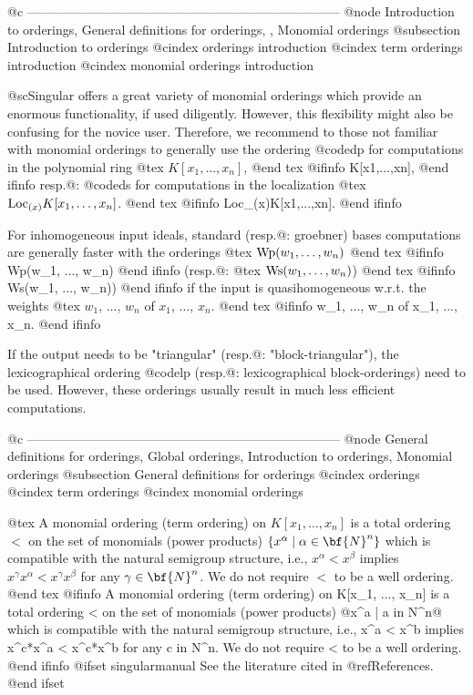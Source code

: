 @c --------------------------------------------------------------------------
@node Introduction to orderings, General definitions for orderings, , Monomial orderings
@subsection Introduction to orderings
@cindex orderings introduction
@cindex term orderings introduction
@cindex monomial orderings introduction

@sc{Singular} offers a great variety of monomial orderings which provide
an enormous functionality, if used diligently. However, this
flexibility might also be confusing for the novice user.  Therefore, we
recommend to those not familiar with monomial orderings to generally use
the ordering @code{dp} for computations in the polynomial ring
@tex
$K[x_1,\ldots,x_n]$, 
@end tex
@ifinfo
K[x1,...,xn], 
@end ifinfo
resp.@:  @code{ds} for computations in the localization 
@tex
$\hbox{Loc}_{(x)}K[x_1,\ldots,x_n]$.
@end tex
@ifinfo
Loc_(x)K[x1,...,xn].
@end ifinfo

For inhomogeneous input ideals,  standard (resp.@: groebner) bases
computations are generally faster 
with the orderings 
@tex
$\hbox{Wp}(w_1, \ldots, w_n)$
@end tex
@ifinfo
Wp(w_1, ..., w_n)
@end ifinfo
(resp.@: 
@tex
$\hbox{Ws}(w_1, \ldots, w_n)$)
@end tex
@ifinfo
Ws(w_1, ..., w_n))
@end ifinfo
if the input is quasihomogeneous w.r.t. the weights 
@tex
$w_1$, $\ldots$, $w_n$ of $x_1$, $\ldots$, $x_n$. 
@end tex
@ifinfo
w_1, ..., w_n of x_1, ..., x_n. 
@end ifinfo

If the output needs to be "triangular" (resp.@: "block-triangular"), the
lexicographical ordering @code{lp} (resp.@: lexicographical
block-orderings) need to be used. However, these orderings usually
result in much less efficient computations.


@c --------------------------------------------------------------------------
@node General definitions for orderings, Global orderings, Introduction to orderings, Monomial orderings
@subsection General definitions for orderings
@cindex orderings
@cindex term orderings
@cindex monomial orderings

@tex
A monomial ordering (term ordering) on $K[x_1, \ldots, x_n]$ is
a total ordering $<$ on the
set of monomials (power products) $\{x^\alpha \mid \alpha \in \bf{N}^n\}$
which is compatible with the
natural semigroup structure, i.e., $x^\alpha < x^\beta$ implies $x^\gamma
x^\alpha < x^\gamma x^\beta$ for any $\gamma \in \bf{N}^n$.
We do not require
$<$ to be  a well ordering.
@end tex
@ifinfo
A monomial ordering (term ordering) on K[x_1, ..., x_n] is
a total ordering < on the
set of monomials (power products) @{x^a | a in N^n@}
which is compatible with the
natural semigroup structure, i.e., x^a < x^b implies x^c*x^a < x^c*x^b for any
c in N^n.
We do not require
< to be  a well ordering.
@end ifinfo
@ifset singularmanual
 See the literature cited in @ref{References}.
@end ifset

